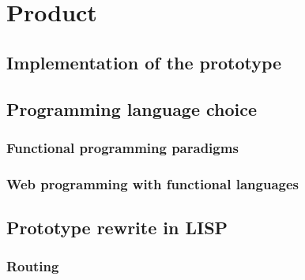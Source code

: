 \chapter{Product}\label{chap:product}

\section{Implementation of the prototype}\label{sec:prototype-implementation}

\cite{brandt2008opportunistic}

\section{Programming language choice}\label{sec:programming-language-choice}


\subsection{Functional programming paradigms}\label{subsec:functional-programming-paradigms}


\cite{hughes1989functional}


\cite{halloway2009programming, fogus2011joy}


\cite{kraus2009multi}


\subsection{Web programming with functional languages}\label{subsec:functional-web}


\section{Prototype rewrite in LISP}\label{sec:prototype-rewrite}


\subsection{Routing}\label{subsec:routing}


